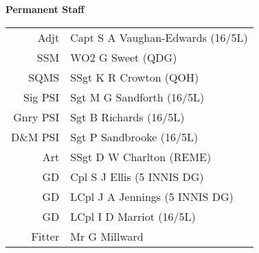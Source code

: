 \vspace*{10mm}

\begin{center}
  \Large
  \textbf{Permanent Staff}
\end{center}

\begin{center}
  \begin{tabular}{rl}
    Adjt & Capt S A Vaughan-Edwards (16/5L) \\
    SSM & WO2 G Sweet (QDG) \\
    SQMS & SSgt K R Crowton (QOH) \\
    Sig PSI & Sgt M G Sandforth (16/5L) \\
    Gnry PSI & Sgt B Richards (16/5L) \\
    D\&M PSI & Sgt P Sandbrooke (16/5L) \\
    Art & SSgt D W Charlton (REME) \\
    GD & Cpl S J Ellis (5 INNIS DG) \\
    GD & LCpl J A Jennings (5 INNIS DG) \\
    GD & LCpl I D Marriot (16/5L) \\
    Fitter & Mr G Millward \\
  \end{tabular}
\end{center}
